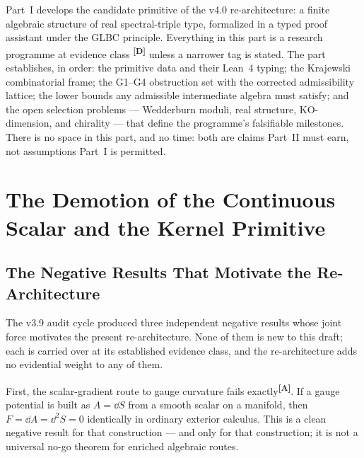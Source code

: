 \documentclass[12pt,a4paper,twoside]{article}
\theoremstyle{plain}
\theoremstyle{definition}
\theoremstyle{remark}
\newcommand{\catmark}[1]{\textsuperscript{\textsf{\textbf{[#1]}}}}
\begin{document}
\noindent Part~I develops the candidate primitive of the v4.0
re-architecture: a finite algebraic structure of real spectral-triple type,
formalized in a typed proof assistant under the GLBC principle. Everything
in this part is a research programme at evidence class \catmark{D} unless
a narrower tag is stated. The part establishes, in order: the primitive
data and their Lean~4 typing; the Krajewski combinatorial frame; the
G1--G4 obstruction set with the corrected admissibility lattice; the lower
bounds any admissible intermediate algebra must satisfy; and the open
selection problems --- Wedderburn moduli, real structure, KO-dimension,
and chirality --- that define the programme's falsifiable milestones.
There is no space in this part, and no time: both are claims Part~II must
earn, not assumptions Part~I is permitted.



\section{The Demotion of the Continuous Scalar and the Kernel Primitive}
\label{sec:demotion}

\subsection{The Negative Results That Motivate the Re-Architecture}
\label{subsec:negative-results}

The v3.9 audit cycle produced three independent negative results whose
joint force motivates the present re-architecture. None of them is new to
this draft; each is carried over at its established evidence class, and the
re-architecture adds no evidential weight to any of them.

First, the scalar-gradient route to gauge curvature fails
exactly\catmark{A}. If a gauge potential is built as $A = \dd S$ from a
smooth scalar on a manifold, then $F = \dd A = \dd^2 S = 0$ identically in
ordinary exterior calculus. This is a clean negative result for that
construction --- and only for that construction; it is not a universal
no-go theorem for enriched algebraic routes.
\end{document}
